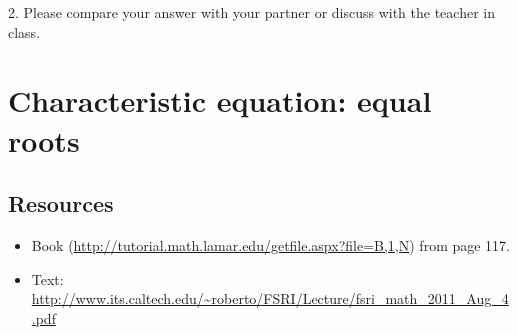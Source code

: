 2. Please compare your answer with your partner or discuss with the teacher in class.



%
%
%
%
%
%
%
%
%
%
%




\newpage
\section{Characteristic equation: equal roots}

\subsection*{Resources}
\begin{itemize}
    \item Book (\url{http://tutorial.math.lamar.edu/getfile.aspx?file=B,1,N}) from page 117.
    \item Text: \url{http://www.its.caltech.edu/~roberto/FSRI/Lecture/fsri_math_2011_Aug_4.pdf}
\end{itemize}

